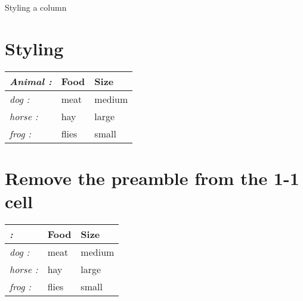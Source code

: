 \documentclass{article}
\begin{document}
Styling a column

\section{Styling}
\begin{tabular}{>{\itshape}l<{:} *{2}{l}}
    \toprule
    Animal  & Food  & Size      \\
    \midrule
    dog     & meat  & medium    \\
    horse   & hay   & large     \\
    frog    & flies & small     \\
    \bottomrule
\end{tabular}

\section{Remove the preamble from the 1-1 cell}
\begin{tabular}{>{\itshape}l<{:} *{2}{l}}
    \toprule
    \multicolumn{1}{l}{Animal}  & Food  & Size      \\ %
    \midrule
    dog     & meat  & medium    \\
    horse   & hay   & large     \\
    frog    & flies & small     \\
    \bottomrule
\end{tabular}
\end{document}
